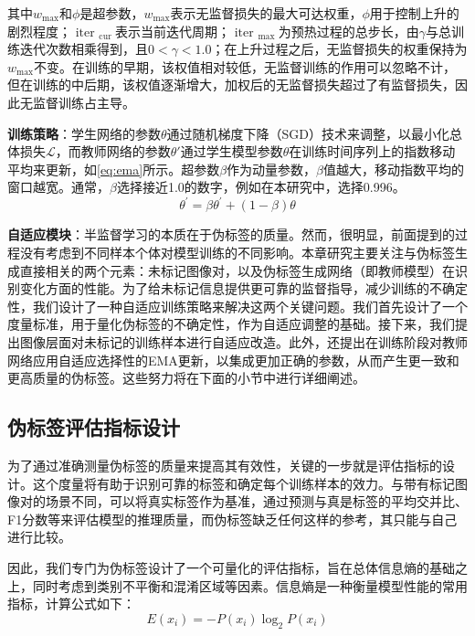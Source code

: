 \documentclass[lang=chs, degree=master, blindreview=false, adobe=false]{yanputhesis}
\begin{document}
其中$w_{\max }$和$\phi$是超参数，$w_{\max }$表示无监督损失的最大可达权重，$\phi$用于控制上升的剧烈程度；$\text { iter }_{\text {cur }}$表示当前迭代周期；$\text { iter }_{\text {max }}$为预热过程的总步长，由$\gamma$与总训练迭代次数相乘得到，且$0<\gamma<1.0$；在上升过程之后，无监督损失的权重保持为$w_{\max }$不变。在训练的早期，该权值相对较低，无监督训练的作用可以忽略不计，但在训练的中后期，该权值逐渐增大，加权后的无监督损失超过了有监督损失，因此无监督训练占主导。

\textbf{训练策略}：学生网络的参数$\theta$通过随机梯度下降（SGD）技术来调整，以最小化总体损失$\mathcal{L}$，而教师网络的参数$\theta'$通过学生模型参数$\theta$在训练时间序列上的指数移动平均来更新，如\ref{eq:ema}所示。超参数$\beta$作为动量参数，$\beta$值越大，移动指数平均的窗口越宽。通常，$\beta$选择接近1.0的数字，例如在本研究中，选择0.996。
\begin{equation}
  \label{eq:ema}
  \theta^{\prime}=\beta \theta^{\prime}+(1-\beta) \theta
\end{equation}

\textbf{自适应模块}：半监督学习的本质在于伪标签的质量。然而，很明显，前面提到的过程没有考虑到不同样本个体对模型训练的不同影响。本章研究主要关注与伪标签生成直接相关的两个元素：未标记图像对，以及伪标签生成网络（即教师模型）在识别变化方面的性能。为了给未标记信息提供更可靠的监督指导，减少训练的不确定性，我们设计了一种自适应训练策略来解决这两个关键问题。我们首先设计了一个度量标准，用于量化伪标签的不确定性，作为自适应调整的基础。接下来，我们提出图像层面对未标记的训练样本进行自适应改造。此外，还提出在训练阶段对教师网络应用自适应选择性的EMA更新，以集成更加正确的参数，从而产生更一致和更高质量的伪标签。这些努力将在下面的小节中进行详细阐述。
\subsection{伪标签评估指标设计}
为了通过准确测量伪标签的质量来提高其有效性，关键的一步就是评估指标的设计。这个度量将有助于识别可靠的标签和确定每个训练样本的效力。与带有标记图像对的场景不同，可以将真实标签作为基准，通过预测与真是标签的平均交并比、F1分数等来评估模型的推理质量，而伪标签缺乏任何这样的参考，其只能与自己进行比较。

因此，我们专门为伪标签设计了一个可量化的评估指标，旨在总体信息熵的基础之上，同时考虑到类别不平衡和混淆区域等因素。信息熵是一种衡量模型性能的常用指标，计算公式如下：
\begin{equation}
  \label{eq:entropy}
  E\left(x_{i}\right)=-P\left(x_{i}\right) \log _{2} P\left(x_{i}\right)
\end{equation}
\end{document}
